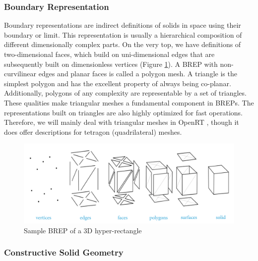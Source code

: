 \documentclass[a4paper,11pt,oneside]{article}
\begin{document}
\subsubsection{Boundary Representation}
    
Boundary representations are indirect definitions of solids in space using their boundary or limit. This representation is usually a hierarchical composition of different dimensionally complex parts. On the very top, we have definitions of two-dimensional faces, which build on uni-dimensional edges that are subsequently built on dimensionless vertices (Figure \ref{fig2:brep_3d_rect}). A BREP with non-curvilinear edges and planar faces is called a polygon mesh. A triangle is the simplest polygon and has the excellent property of always being co-planar. Additionally, polygons of any complexity are representable by a set of triangles. These qualities make triangular meshes a fundamental component in BREPs. The representations built on triangles are also highly optimized for fast operations. Therefore, we will mainly deal with triangular meshes in OpenRT \cite{openrt}, though it does offer descriptions for tetragon (quadrilateral) meshes.
    
    
\begin{figure}[ht]
	\begin{center}
		\includegraphics[width=.8\textwidth]{section1/brep-overview.png}
	\end{center}
	\caption{Sample BREP of a 3D hyper-rectangle \cite{wikipedia_2021_mesh_rep}}
	\label{fig2:brep_3d_rect}
\end{figure}
    
\subsubsection{Constructive Solid Geometry}
\end{document}
